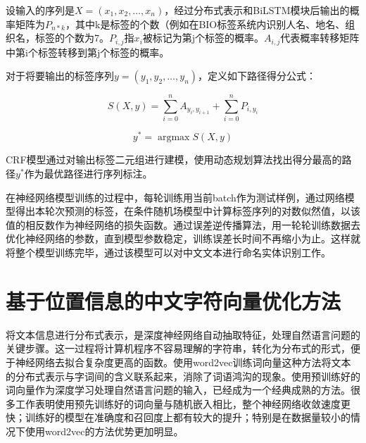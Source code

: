 \documentclass[winfonts,master,oneside,nobackinfo]{njuthesis}
\begin{document}
设输入的序列是$X=\left(x_{1}, x_{2}, \ldots, x_{n}\right)$，经过分布式表示和BiLSTM模块后输出的概率矩阵为$P_{n * k}$，其中k是标签的个数（例如在BIO标签系统内识别人名、地名、组织名，标签的个数为7。$P_{i, j}$指$x_{i}$被标记为第j个标签的概率。$A_{i, j}$代表概率转移矩阵中第i个标签转移到第j个标签的概率。

对于将要输出的标签序列$y=\left(y_{1}, y_{2}, \ldots, y_{n}\right)$，定义如下路径得分公式：

\begin{equation}
S(X, y)=\sum_{i=0}^{n} A_{y_{i}, y_{i+1}}+\sum_{i=0}^{n} P_{i, y_{i}} 
\end{equation}

\begin{equation}
y^{*}=\operatorname{argmax} S(X, y)
\end{equation}

CRF模型通过对输出标签二元组进行建模，使用动态规划算法找出得分最高的路径$y^{*}$作为最优路径进行序列标注。

在神经网络模型训练的过程中，每轮训练用当前batch作为测试样例，通过网络模型得出本轮次预测的标签，在条件随机场模型中计算标签序列的对数似然值，以该值的相反数作为神经网络的损失函数。通过误差逆传播算法，用一轮轮训练数据去优化神经网络的参数，直到模型参数稳定，训练误差长时间不再缩小为止。这样就将整个模型训练完毕，通过该模型可以对中文文本进行命名实体识别工作。



\section{基于位置信息的中文字符向量优化方法}

将文本信息进行分布式表示，是深度神经网络自动抽取特征，处理自然语言问题的关键步骤。这一过程将计算机程序不容易理解的字符串，转化为分布式的形式，便于神经网络去拟合复杂度更高的函数。使用word2vec训练词向量这种方法将文本的分布式表示与字词间的含义联系起来，消除了词语鸿沟的现象。使用预训练好的词向量作为深度学习处理自然语言问题的输入，已经成为一个经典成熟的方法。很多工作表明\cite{Yoon}使用预先训练好的词向量与随机嵌入相比，整个神经网络收敛速度更快；训练好的模型在准确度和召回度上都有较大的提升；特别是在数据量较小的情况下使用word2vec的方法优势更加明显。
\end{document}
